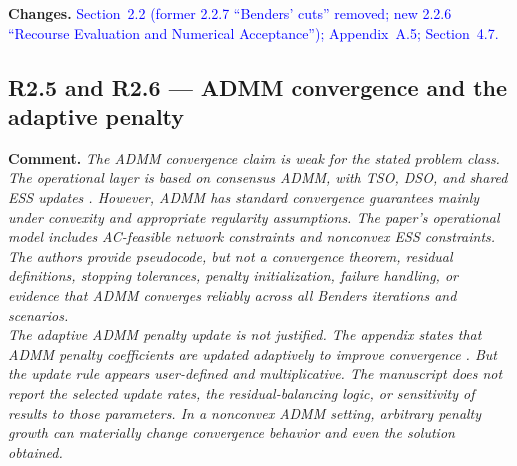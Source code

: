 \documentclass[11pt]{article}
\newcommand{\rcomment}[1]{\par\medskip\noindent\textbf{Comment.} \textit{#1}\par\smallskip}
\newcommand{\rchanges}[1]{\noindent\textbf{Changes.} \textcolor{blue}{#1}\par\medskip}
\begin{document}
\rchanges{
    Section~2.2 (former 2.2.7 ``Benders' cuts'' removed; 
    new 2.2.6 ``Recourse Evaluation and Numerical Acceptance''); 
    Appendix~A.5; Section~4.7.
}

\subsection*{R2.5 and R2.6 --- ADMM convergence and the adaptive penalty}
\rcomment{
The ADMM convergence claim is weak for the stated problem class. The operational layer is based on consensus ADMM, with TSO, DSO, and shared ESS updates . However, ADMM has standard convergence guarantees mainly under convexity and appropriate regularity assumptions. The paper's operational model includes AC-feasible network constraints and nonconvex ESS constraints. The authors provide pseudocode, but not a convergence theorem, residual definitions, stopping tolerances, penalty initialization, failure handling, or evidence that ADMM converges reliably across all Benders iterations and scenarios.\\
The adaptive ADMM penalty update is not justified. The appendix states that ADMM penalty coefficients are updated adaptively to improve convergence . But the update rule appears user-defined and multiplicative. The manuscript does not report the selected update rates, the residual-balancing logic, or sensitivity of results to those parameters. In a nonconvex ADMM setting, arbitrary penalty growth can materially change convergence behavior and even the solution obtained.
}
\end{document}
